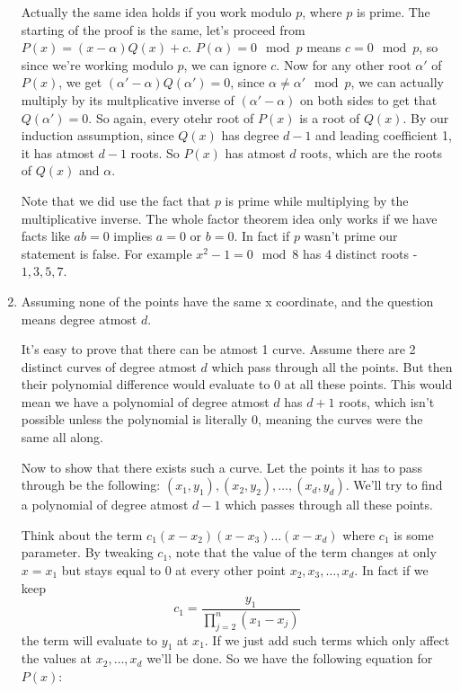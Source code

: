 \documentclass[12pt]{report}
\begin{document}
\begin{enumerate}[label=\textbf{\arabic*.}]
    Actually the same idea holds if you work modulo $p$, where $p$ is prime. The starting of the proof is the same, let's 
    proceed from $P(x) = (x - \alpha)Q(x) + c$. $P(\alpha) = 0 \mod p$ means $c = 0 \mod p$, so since we're working modulo $p$, 
    we can ignore $c$. Now for any other root $\alpha'$ of $P(x)$, we get $(\alpha' - \alpha)Q(\alpha') = 0$, since $\alpha 
    \neq \alpha' \mod p$, we can actually multiply by its multplicative inverse of $(\alpha' - \alpha)$ on both sides to get that 
    $Q(\alpha') = 0$. So again, every otehr root of $P(x)$ is a root of $Q(x)$. By our induction assumption, since $Q(x)$ 
    has degree $d-1$ and leading coefficient 1, it has atmost $d-1$ roots. So $P(x)$ has atmost $d$ roots, which are the roots 
    of $Q(x)$ and $\alpha$.

    Note that we did use the fact that $p$ is prime while multiplying by the multiplicative inverse. The whole factor theorem
    idea only works if we have facts like $ab = 0$ implies $a = 0$ or $b = 0$. In fact if $p$ wasn't prime our statement is 
    false. For example $x^2 - 1 = 0 \mod 8$ has 4 distinct roots - $1, 3, 5, 7$.

    \item Assuming none of the points have the same x coordinate, and the question means degree atmost $d$.
    
    It's easy to prove that there can be atmost 1 curve. Assume there are 2 distinct curves of degree atmost $d$ which pass through
    all the points. But then their polynomial difference would evaluate to 0 at all these points. This would mean we have a polynomial
    of degree atmost $d$ has $d+1$ roots, which isn't possible unless the polynomial is literally 0, meaning the curves were
    the same all along.

    Now to show that there exists such a curve. Let the points it has to pass through be the following:
    $(x_1, y_1), (x_2, y_2), \dots, (x_d, y_d)$. We'll try to find a polynomial of degree atmost $d-1$ which passes through all 
    these points.

    Think about the term $c_1(x - x_2)(x - x_3)\dots(x - x_d)$ where $c_1$ is some parameter. By tweaking $c_1$, note that the value 
    of the term changes at only $x = x_1$ but stays equal to 0 at every other point $x_2, x_3, \dots, x_d$. In fact if we keep 
    \[c_1  = \frac{y_1}{\prod_{j = 2}^n (x_1 - x_j)} \]
    the term will evaluate to $y_1$ at $x_1$. If we just add such terms which only affect the values at $x_2, \dots, x_d$ we'll be 
    done. So we have the following equation for $P(x)$:


\end{enumerate}
\end{document}
